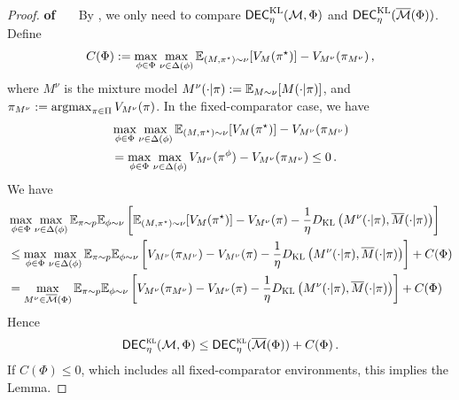 \begin{proof}\textbf{of \ \ }
By , we only need to compare $\mathsf{DEC}^{\textrm{KL}}_\eta(\mathcal{M}, \Phi)$ and $\mathsf{DEC}^{\textrm{KL}}_\eta(\overline{\mathcal{M}}(\Phi))$. 
Define 
    \begin{align*}
        C(\Phi) := \max_{\phi\in\Phi}\max_{\nu\in\Delta(\phi)}\mathbb{E}_{(M,\pi^\star)\sim\nu}[V_M(\pi^\star)]-V_{M^\nu}(\pi_{M^\nu})\,,
    \end{align*}
where $M^\nu$ is the mixture model $M^\nu(\cdot|\pi) := \mathbb{E}_{M\sim \nu}[M(\cdot|\pi)]$, and $\pi_{M^\nu} := \operatorname*{argmax}_{\pi\in\Pi} V_{M^\nu}(\pi)$. 
In the fixed-comparator case, we have
\begin{align*}
&\max_{\phi\in\Phi}\max_{\nu\in\Delta(\phi)}\mathbb{E}_{(M,\pi^\star)\sim\nu}[V_M(\pi^\star)]-V_{M^\nu}(\pi_{M^\nu})\\
&=\max_{\phi\in\Phi}\max_{\nu\in\Delta(\phi)}V_{M^\nu}(\pi^\phi)-V_{M^\nu}(\pi_{M^\nu})\leq 0\,.
\end{align*}
We have
\begin{align*}
    &\max_{\phi\in\Phi} \max_{\nu\in \Delta(\phi)}   \E_{\pi\sim p} \E_{\phi\sim \nu}   \left[\E_{(M,\pi^\star)\sim \nu}[V_{M}(\pi^\star)] - V_{M^\nu}(\pi) - \frac{1}{\eta}  \KL\left( M^{\nu}(\cdot|\pi), \Bar{M}(\cdot|\pi) \right)\right]\\
    &\leq \max_{\phi\in\Phi} \max_{\nu\in \Delta(\phi)}   \E_{\pi\sim p} \E_{\phi\sim \nu}   \left[V_{M^\nu}(\pi_{M^\nu}) - V_{M^\nu}(\pi) - \frac{1}{\eta}  \KL\left( M^{\nu}(\cdot|\pi), \Bar{M}(\cdot|\pi) \right)\right] + C(\Phi)\\
    &=\max_{M^\nu\in\bar\calM(\Phi)}  \E_{\pi\sim p} \E_{\phi\sim \nu}   \left[V_{M^\nu}(\pi_{M^\nu}) - V_{M^\nu}(\pi) - \frac{1}{\eta}  \KL\left( M^{\nu}(\cdot|\pi), \Bar{M}(\cdot|\pi) \right)\right] + C(\Phi)
\end{align*}
Hence
\begin{align*}
    \mathsf{DEC}^{\textsc{kl}}_\eta(\mathcal{M},\Phi)\leq \mathsf{DEC}^{\textsc{kl}}_\eta(\overline{\mathcal{M}}(\Phi)) + C(\Phi)\,. 
\end{align*}
If $C(\Phi)\leq 0$, which includes all fixed-comparator environments, this implies the Lemma.


\end{proof}
